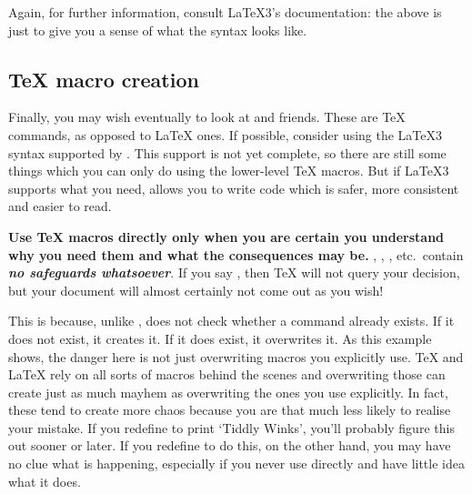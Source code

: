 Again, for further information, consult \LaTeX 3's documentation: the above is just to give you a sense of what the syntax looks like.


\subsection{\TeX{} macro creation}\label{subsec:tex}


Finally, you may wish eventually to look at  and friends.
These are \TeX{} commands, as opposed to \LaTeX{} ones.
If possible, consider using the \LaTeX 3 syntax supported by .
This support is not yet complete, so there are still some things which you can only do using the lower-level \TeX{} macros.
But if \LaTeX 3 supports what you need,  allows you to write code which is safer, more consistent and easier to read.

\textbf{Use \TeX{} macros directly only when you are certain you understand why you need them and what the consequences may be.}
, , ,  etc.\ contain \emph{\bfseries no safeguards whatsoever}.
If you say , then \TeX{} will not query your decision, but your document will almost certainly not come out as you wish!

This is because, unlike ,  does not check whether a command already exists.
If it does not exist, it creates it.
If it does exist, it overwrites it.
As this example shows, the danger here is not just overwriting macros you explicitly use.
\TeX{} and \LaTeX{} rely on all sorts of macros behind the scenes and overwriting those can create just as much mayhem as overwriting the ones you use explicitly.
In fact, these tend to create more chaos because you are that much less likely to realise your mistake.
If you redefine  to print ‘Tiddly Winks’, you'll probably figure this out sooner or later.
If you redefine  to do this, on the other hand, you may have no clue what is happening, especially if you never use  directly and have little idea what it does.

\begin{center}
  \LARGE{}
\end{center}



\mode*


